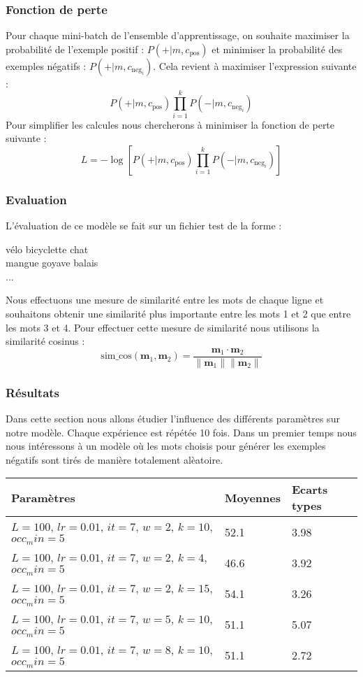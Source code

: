 \documentclass[12pt]{article}
\begin{document}
\subsubsection{Fonction de perte}
Pour chaque mini-batch de l’ensemble d’apprentissage, on souhaite maximiser la probabilité de l’exemple positif : 
$P(+|m, c_{\text{pos}})$ et minimiser la probabilité des exemples négatifs : $P(+|m, c_{\text{neg}_i})$. Cela revient à maximiser l’expression suivante :
\[
P(+|m, c_{\text{pos}}) \prod_{i=1}^{k} P(-|m, c_{\text{neg}_i})
\]
Pour simplifier les calcules nous chercherons à minimiser la fonction de perte suivante : 
\[
L = - \log \left[ P(+|m, c_{\text{pos}}) \prod_{i=1}^{k} P(-|m, c_{\text{neg}_i}) \right]
\]


\subsubsection{Evaluation}
L'évaluation de ce modèle se fait sur un fichier test de la forme :
\begin{center}
vélo bicyclette chat\\
mangue goyave balais\\
...\\
\end{center}
Nous effectuons une mesure de similarité entre les mots de chaque ligne et souhaitons obtenir
une similarité plus importante entre les mots 1 et 2 que entre les mots 3 et 4. Pour effectuer cette mesure de 
similarité nous utilisons la similarité cosinus :
\[
\text{sim\_cos}(\mathbf{m}_1, \mathbf{m}_2) = \frac{\mathbf{m}_1 \cdot \mathbf{m}_2}{\|\mathbf{m}_1\| \|\mathbf{m}_2\|}
\]
\subsubsection{Résultats}
Dans cette section nous allons étudier l'influence des différents paramètres sur notre modèle. 
Chaque expérience est répétée 10 fois. 
Dans un premier temps nous nous intéressons à un modèle où les mots choisis pour générer les exemples négatifs
sont tirés de manière totalement alèatoire.
\newline
\newline
\begin{tabularx}{\textwidth}{|X|X|X|}
    \hline
    Paramètres & Moyennes & Ecarts types \\ 
    \hline
    $L=100$, $lr=0.01$,  $it=7$, $w=2$, $k=10$, $occ_min=5$  & 52.1  & 3.98  \\ 
    \hline
    $L=100$, $lr=0.01$,  $it=7$, $w=2$, $k=4$, $occ_min=5$  & 46.6  & 3.92  \\ 
    \hline
    $L=100$, $lr=0.01$,  $it=7$, $w=2$, $k=15$, $occ_min=5$  & 54.1  & 3.26  \\ 
    \hline
    $L=100$, $lr=0.01$,  $it=7$, $w=5$, $k=10$, $occ_min=5$  & 51.1  & 5.07  \\ 
    \hline
    $L=100$, $lr=0.01$,  $it=7$, $w=8$, $k=10$, $occ_min=5$  & 51.1  &  2.72  \\ 
    \hline
    \end{tabularx}
\end{document}
